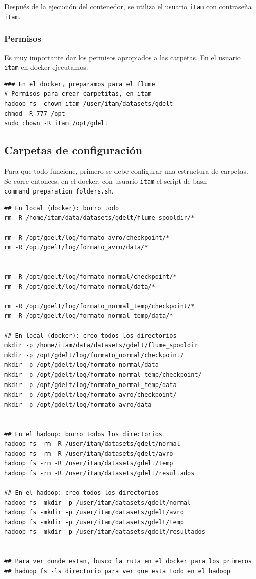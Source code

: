 \documentclass[]{article}
\begin{document}
Después de la ejecución del contenedor, se utiliza el usuario
\texttt{itam} con contraseña \texttt{itam}.

\subsubsection{Permisos}\label{permisos}

Es muy importante dar los permisos apropiados a las carpetas. En el
usuario \texttt{itam} en docker ejecutamos:

\begin{verbatim}
### En el docker, preparamos para el flume
# Permisos para crear carpetitas, en itam
hadoop fs -chown itam /user/itam/datasets/gdelt
chmod -R 777 /opt
sudo chown -R itam /opt/gdelt
\end{verbatim}

\subsection{Carpetas de configuración}\label{carpetas-de-configuracion}

Para que todo funcione, primero se debe configurar una estructura de
carpetas. Se corre entonces, en el docker, con usuario \texttt{itam} el
script de bash \texttt{command\_preparation\_folders.sh}.

\begin{verbatim}
## En local (docker): borro todo
rm -R /home/itam/data/datasets/gdelt/flume_spooldir/*

rm -R /opt/gdelt/log/formato_avro/checkpoint/*
rm -R /opt/gdelt/log/formato_avro/data/*


rm -R /opt/gdelt/log/formato_normal/checkpoint/*
rm -R /opt/gdelt/log/formato_normal/data/*

rm -R /opt/gdelt/log/formato_normal_temp/checkpoint/*
rm -R /opt/gdelt/log/formato_normal_temp/data/*

## En local (docker): creo todos los directorios
mkdir -p /home/itam/data/datasets/gdelt/flume_spooldir
mkdir -p /opt/gdelt/log/formato_normal/checkpoint/
mkdir -p /opt/gdelt/log/formato_normal/data
mkdir -p /opt/gdelt/log/formato_normal_temp/checkpoint/
mkdir -p /opt/gdelt/log/formato_normal_temp/data
mkdir -p /opt/gdelt/log/formato_avro/checkpoint/
mkdir -p /opt/gdelt/log/formato_avro/data


## En el hadoop: borro todos los directorios
hadoop fs -rm -R /user/itam/datasets/gdelt/normal
hadoop fs -rm -R /user/itam/datasets/gdelt/avro
hadoop fs -rm -R /user/itam/datasets/gdelt/temp
hadoop fs -rm -R /user/itam/datasets/gdelt/resultados

## En el hadoop: creo todos los directorios
hadoop fs -mkdir -p /user/itam/datasets/gdelt/normal
hadoop fs -mkdir -p /user/itam/datasets/gdelt/avro
hadoop fs -mkdir -p /user/itam/datasets/gdelt/temp
hadoop fs -mkdir -p /user/itam/datasets/gdelt/resultados


## Para ver donde estan, busco la ruta en el docker para los primeros
## hadoop fs -ls directorio para ver que esta todo en el hadoop
\end{verbatim}
\end{document}
